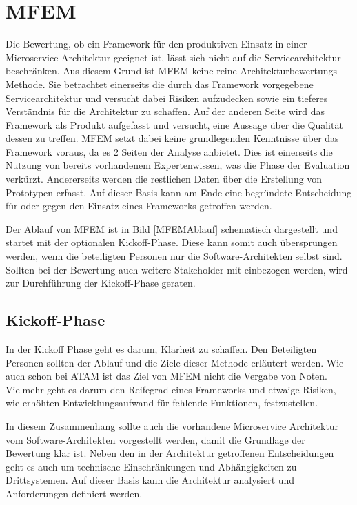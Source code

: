 \section{\acf{MFEM}}

Die Bewertung, ob ein Framework für den produktiven Einsatz in einer Microservice Architektur geeignet ist, lässt sich nicht auf die Servicearchitektur beschränken. Aus diesem Grund ist \ac{MFEM} keine reine Architekturbewertungs-Methode. Sie betrachtet einerseits die durch das Framework vorgegebene Servicearchitektur und versucht dabei Risiken aufzudecken sowie ein tieferes Verständnis für die Architektur zu schaffen. Auf der anderen Seite wird das Framework als Produkt aufgefasst und versucht, eine Aussage über die Qualität dessen zu treffen. \ac{MFEM} setzt dabei keine grundlegenden Kenntnisse über das Framework voraus, da es 2 Seiten der Analyse anbietet. Dies ist einerseits die Nutzung von bereits vorhandenem Expertenwissen, was die Phase der Evaluation verkürzt. Andererseits werden die restlichen Daten über die Erstellung von Prototypen erfasst.
Auf dieser Basis kann am Ende eine begründete Entscheidung für oder gegen den Einsatz eines Frameworks getroffen werden.

Der Ablauf von \ac{MFEM} ist in Bild \ref{MFEMAblauf} schematisch dargestellt und startet mit der optionalen Kickoff-Phase. Diese kann somit auch übersprungen werden, wenn die beteiligten Personen nur die Software-Architekten selbst sind. Sollten bei der Bewertung auch weitere Stakeholder mit einbezogen werden, wird zur Durchführung der Kickoff-Phase geraten.


\subsection{Kickoff-Phase}

In der Kickoff Phase geht es darum, Klarheit zu schaffen. Den Beteiligten Personen sollten der Ablauf und die Ziele dieser Methode erläutert werden. Wie auch schon bei \ac{ATAM} ist das Ziel von \ac{MFEM} nicht die Vergabe von Noten. Vielmehr geht es darum den Reifegrad eines Frameworks und etwaige Risiken, wie erhöhten Entwicklungsaufwand für fehlende Funktionen, festzustellen. 

In diesem Zusammenhang sollte auch die vorhandene Microservice Architektur vom Software-Architekten vorgestellt werden, damit die Grundlage der Bewertung klar ist. Neben den in der Architektur getroffenen Entscheidungen geht es auch um technische Einschränkungen und Abhängigkeiten zu Drittsystemen. Auf dieser Basis kann die Architektur analysiert und Anforderungen definiert werden.

